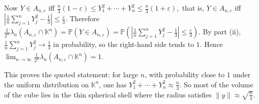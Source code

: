 \documentclass[letterpaper]{article}
\begin{document}
\begin{enumerate}
			Now
			$
			Y\in A_{n,\varepsilon}
			$
			iff
			$
			\frac{n}{3}(1-\varepsilon)
			\le
			Y_1^2+\cdots+Y_n^2
			\le
			\frac{n}{3}(1+\varepsilon),
			$
			that is,
			$
			Y\in A_{n,\varepsilon}
			$
			iff
			$
			\left|
			\frac{1}{n}\sum_{j=1}^n Y_j^2-\frac13
			\right|
			\le
			\frac{\varepsilon}{3}.
			$
			Therefore
			$
			\frac{1}{2^n}\lambda_n(A_{n,\varepsilon}\cap \mathbb{K}^n)
			=
			\mathbb{P}(Y\in A_{n,\varepsilon})
			=
			\mathbb{P}\!\left(
			\left|
			\frac{1}{n}\sum_{j=1}^n Y_j^2-\frac13
			\right|
			\le
			\frac{\varepsilon}{3}
			\right).
			$
			By part (ii), $\frac1n\sum_{j=1}^n Y_j^2\to \frac13$ in probability, so the right-hand side tends to $1$. Hence
			$
			\lim_{n\to\infty}
			\frac{1}{2^n}\lambda_n(A_{n,\varepsilon}\cap \mathbb{K}^n)=1.
			$
			
			This proves the quoted statement: for large $n$, with probability close to $1$ under the uniform distribution on $\mathbb{K}^n$, one has
			$
			Y_1^2+\cdots+Y_n^2\approx \frac{n}{3}.
			$
			So most of the volume of the cube lies in the thin spherical shell where the radius satisfies
			$
			\|y\|\approx \sqrt{\frac{n}{3}}.
			$
			
		\end{enumerate}
		
		
	
\end{document}
